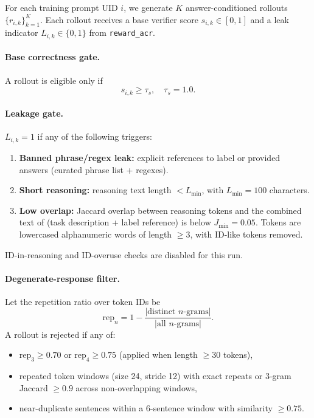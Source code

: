 For each training prompt UID $i$, we generate $K$ answer-conditioned rollouts
$\{r_{i,k}\}_{k=1}^K$. Each rollout receives a base verifier score
$s_{i,k} \in [0,1]$ and a leak indicator $L_{i,k} \in \{0,1\}$ from
\texttt{reward\_acr}.

\paragraph{Base correctness gate.}
A rollout is eligible only if
\[
s_{i,k} \ge \tau_s,\quad \tau_s = 1.0.
\]

\paragraph{Leakage gate.}
$L_{i,k}=1$ if any of the following triggers:
\begin{enumerate}
  \item \textbf{Banned phrase/regex leak:} explicit references to label or
        provided answers (curated phrase list + regexes).
  \item \textbf{Short reasoning:} reasoning text length
        $< L_{\min}$, with $L_{\min}=100$ characters.
  \item \textbf{Low overlap:} Jaccard overlap between reasoning tokens and
        the combined text of (task description + label reference) is below
        $J_{\min}=0.05$. Tokens are lowercased alphanumeric words of length
        $\ge 3$, with ID-like tokens removed.
\end{enumerate}
ID-in-reasoning and ID-overuse checks are disabled for this run.

\paragraph{Degenerate-response filter.}
Let the repetition ratio over token IDs be
\[
\text{rep}_n = 1 - \frac{\lvert \text{distinct } n\text{-grams}\rvert}
{\lvert \text{all } n\text{-grams}\rvert}.
\]
A rollout is rejected if any of:
\begin{itemize}
  \item $\text{rep}_3 \ge 0.70$ or $\text{rep}_4 \ge 0.75$ (applied when length
        $\ge 30$ tokens),
  \item repeated token windows (size 24, stride 12) with exact repeats or
        3-gram Jaccard $\ge 0.9$ across non-overlapping windows,
  \item near-duplicate sentences within a 6-sentence window with similarity
        $\ge 0.75$.
\end{itemize}

